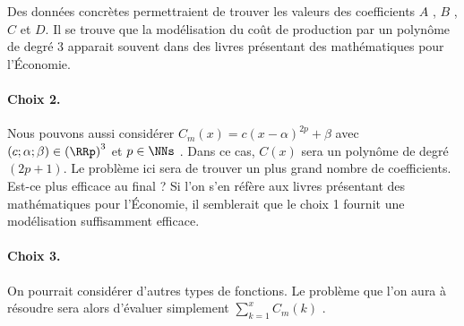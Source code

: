 \bigskip

Des données concrètes permettraient de trouver les valeurs des coefficients $A$ , $B$ , $C$ et $D$. Il se trouve que la modélisation du coût de production par un polynôme de degré 3 apparait souvent dans des livres présentant des mathématiques pour l'Économie.




\bigskip

\paragraph{Choix 2.}

Nous pouvons aussi considérer $C_m(x) = c (x - \alpha)^{2p} + \beta$ avec $(c ; \alpha ; \beta) \in \left( \RRp \right)^3$ et $p \in \NNs$ .
Dans ce cas, $C(x)$ sera un polynôme de degré $(2p + 1)$. Le problème ici sera de trouver un plus grand nombre de coefficients. Est-ce plus efficace au final ? Si l'on s'en réfère aux livres présentant des mathématiques pour l'Économie, il semblerait que le choix 1 fournit une modélisation suffisamment efficace.




\bigskip

\paragraph{Choix 3.}

On pourrait considérer d'autres types de fonctions. Le problème que l'on aura à résoudre sera alors d'évaluer simplement $\displaystyle \sum_{k = 1}^{x} C_m(k)$ .
